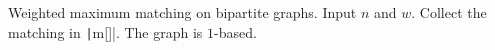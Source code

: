Weighted maximum matching on bipartite graphs. Input $n$ and $w$. Collect the matching in \texttt|m[]|. The graph is $1$-based.

\inputminted{cpp}{src/graph/matching/kuhn-munkres-algorithm.cpp.com}

